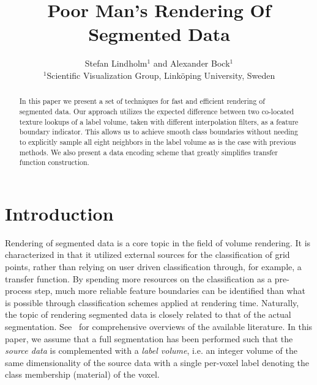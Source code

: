 \documentclass{egpubl}
\title[PMS]%
      {Poor Man's Rendering Of Segmented Data}
\author[S. Lindholm \& A. Bock]
       {Stefan Lindholm$^{1}$
        and Alexander Bock$^{1}$
        \\
         $^1$Scientific Visualization Group, Link\"{o}ping University, Sweden
       }
\begin{document}

\maketitle

\begin{abstract}
In this paper we present a set of techniques for fast and efficient rendering of segmented data. Our approach utilizes the expected difference between two co-located texture lookups of a label volume, taken with different interpolation filters, as a feature boundary indicator. This allows us to achieve smooth class boundaries without needing to explicitly sample all eight neighbors in the label volume as is the case with previous methods. We also present a data encoding scheme that greatly simplifies transfer function construction.

\begin{classification} %
\end{classification}

\end{abstract}




\def\myitem{\diamond}




\section{Introduction}

Rendering of segmented data is a core topic in the field of volume rendering. It is characterized in that it utilized external sources for the classification of grid points, rather than relying on user driven classification through, for example, a transfer function. By spending more resources on the classification as a pre-process step, much more reliable feature boundaries can be identified than what is possible through classification schemes applied at rendering time. Naturally, the topic of rendering segmented data is closely related to that of the actual segmentation. See~\cite{kaufman2000real, VisHandbook, udupa2000three} for comprehensive overviews of the available literature. In this paper, we assume that a full segmentation has been performed such that the \emph{source data} is complemented with a \emph{label volume}, i.e. an integer volume of the same dimensionality of the source data with a single per-voxel label denoting the class membership (material) of the voxel.
\end{document}
